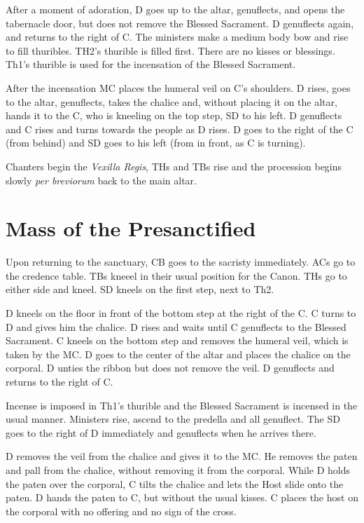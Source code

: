 {    \rubric After a moment of adoration, D goes up to the altar, genuflects,
    and opens the tabernacle door, but does not remove the Blessed Sacrament. D
    genuflects again, and returns to the right of C. The ministers make a
    medium body bow and rise to fill thuribles. TH2's thurible is filled first.
    There are no kisses or blessings. Th1's thurible is used for the
    incensation of the Blessed Sacrament.

    \rubric After the incensation MC places the humeral veil on C's shoulders.
    D rises, goes to the altar, genuflects, takes the chalice and, without
    placing it on the altar, hands it to the C, who is kneeling on the top
    step, SD to his left. D genuflects and C rises and turns towards the people
    as D rises. D goes to the right of the C (from behind) and SD goes to his
    left (from in front, as C is turning).

    \rubric Chanters begin the \textit{Vexilla Regis}, THs and TBs rise and the
    procession begins slowly \textit{per breviorum} back to the main altar.

    \section{Mass of the Presanctified}

    \rubric Upon returning to the sanctuary, CB goes to the sacristy
    immediately. ACs go to the credence table. TBs kneeel in their usual
    position for the Canon. THs go to either side and kneel. SD kneels on the
    first step, next to Th2.

    \rubric D kneels on the floor in front of the bottom step at the right of
    the C. C turns to D and gives him the chalice. D rises and waits until C
    genuflects to the Blessed Sacrament. C kneels on the bottom step and
    removes the humeral veil, which is taken by the MC. D goes to the center of
    the altar and places the chalice on the corporal. D unties the ribbon but
    does not remove the veil. D genuflects and returns to the right of C.

    \rubric Incense is imposed in Th1's thurible and the Blessed Sacrament is
    incensed in the usual manner. Ministers rise, ascend to the predella and
    all genuflect. The SD goes to the right of D immediately and genuflects
    when he arrives there.

    \rubric D removes the veil from the chalice and gives it to the MC. He
    removes the paten and pall from the chalice, without removing it from the
    corporal. While D holds the paten over the corporal, C tilts the chalice
    and lets the Host slide onto the paten. D hands the paten to C, but without
    the usual kisses. C places the host on the corporal with no offering and no
    sign of the cross.

}
